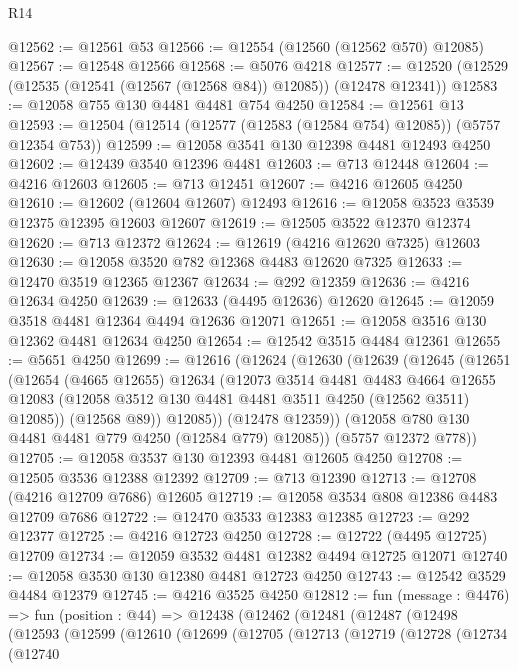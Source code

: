 \begin{lexlean}{R14}
\begin{coremodule}
@12562 := @12561 @53
@12566 := @12554 (@12560 (@12562 @570) @12085)
@12567 := @12548 @12566
@12568 := @5076 @4218
@12577 := @12520 (@12529 (@12535 (@12541 (@12567 (@12568 @84)) @12085)) (@12478 @12341))
@12583 := @12058 @755 @130 @4481 @4481 @754 @4250
@12584 := @12561 @13
@12593 := @12504 (@12514 (@12577 (@12583 (@12584 @754) @12085)) (@5757 @12354 @753))
@12599 := @12058 @3541 @130 @12398 @4481 @12493 @4250
@12602 := @12439 @3540 @12396 @4481
@12603 := @713 @12448
@12604 := @4216 @12603
@12605 := @713 @12451
@12607 := @4216 @12605 @4250
@12610 := @12602 (@12604 @12607) @12493
@12616 := @12058 @3523 @3539 @12375 @12395 @12603 @12607
@12619 := @12505 @3522 @12370 @12374
@12620 := @713 @12372
@12624 := @12619 (@4216 @12620 @7325) @12603
@12630 := @12058 @3520 @782 @12368 @4483 @12620 @7325
@12633 := @12470 @3519 @12365 @12367
@12634 := @292 @12359
@12636 := @4216 @12634 @4250
@12639 := @12633 (@4495 @12636) @12620
@12645 := @12059 @3518 @4481 @12364 @4494 @12636 @12071
@12651 := @12058 @3516 @130 @12362 @4481 @12634 @4250
@12654 := @12542 @3515 @4484 @12361
@12655 := @5651 @4250
@12699 := @12616
    (@12624
      (@12630
        (@12639
          (@12645
            (@12651
              (@12654
                (@4665 @12655)
                @12634
                (@12073
                  @3514
                  @4481
                  @4483
                  @4664
                  @12655
                  @12083
                  (@12058 @3512 @130 @4481 @4481 @3511 @4250 (@12562 @3511) @12085))
                (@12568 @89))
              @12085))
          (@12478 @12359))
        (@12058 @780 @130 @4481 @4481 @779 @4250 (@12584 @779) @12085))
      (@5757 @12372 @778))
@12705 := @12058 @3537 @130 @12393 @4481 @12605 @4250
@12708 := @12505 @3536 @12388 @12392
@12709 := @713 @12390
@12713 := @12708 (@4216 @12709 @7686) @12605
@12719 := @12058 @3534 @808 @12386 @4483 @12709 @7686
@12722 := @12470 @3533 @12383 @12385
@12723 := @292 @12377
@12725 := @4216 @12723 @4250
@12728 := @12722 (@4495 @12725) @12709
@12734 := @12059 @3532 @4481 @12382 @4494 @12725 @12071
@12740 := @12058 @3530 @130 @12380 @4481 @12723 @4250
@12743 := @12542 @3529 @4484 @12379
@12745 := @4216 @3525 @4250
@12812 := fun (message : @4476) =>
  fun (position : @44) =>
  @12438
    (@12462
      (@12481
        (@12487
          (@12498
            (@12593
              (@12599
                (@12610
                  (@12699
                    (@12705
                      (@12713
                        (@12719
                          (@12728
                            (@12734
                              (@12740

\end{coremodule}
\end{lexlean}
